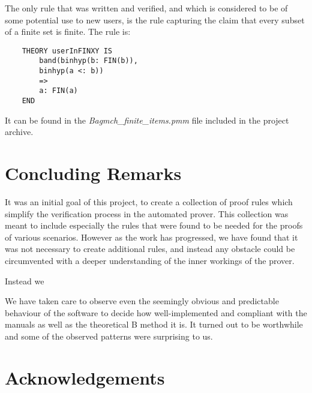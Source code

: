\documentclass[11pt,journal]{IEEEtran}
\begin{document}
	The only rule that was written and verified, and which is considered to be of some potential use to new users, is the rule capturing the claim that every subset of a finite set is finite. The rule is:
	\begin{lstlisting}
	THEORY userInFINXY IS
		band(binhyp(b: FIN(b)), 
		binhyp(a <: b))
		=>
		a: FIN(a)
	END
	\end{lstlisting}
	It can be found in the \emph{Bagmch\_finite\_items.pmm} file included in the project archive.
	
	
	\section{Concluding Remarks}

	It was an initial goal of this project, to create a collection of proof rules which simplify the verification process in the automated prover. This collection was meant to include especially the rules that were found to be needed for the proofs of various scenarios. However as the work has progressed, we have found that it was not necessary to create additional rules, and instead any obstacle could be circumvented with a deeper understanding of the inner workings of the prover.
	
	Instead we 
	
	We have taken care to observe even the seemingly obvious and predictable behaviour of the software to decide how well-implemented and compliant with the manuals as well as the theoretical B method it is. It turned out to be worthwhile and some of the observed patterns were surprising to us.

	
	\section{Acknowledgements}
	
	\IEEEPARstart{}{} 
	
\end{document}
